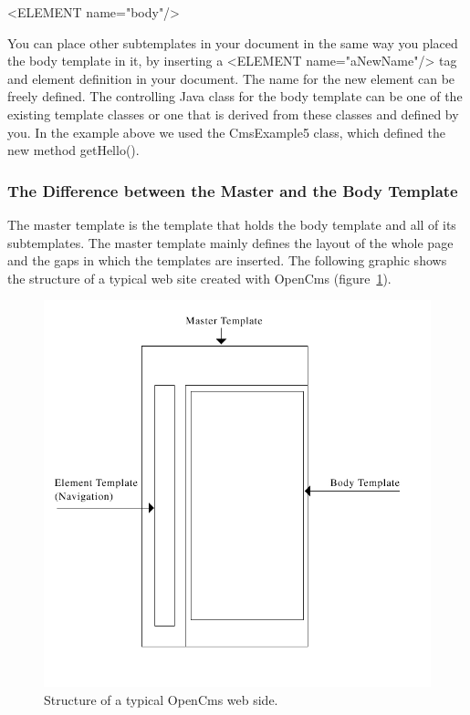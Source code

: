 {\tag <ELEMENT name="body"/>}

You can place other subtemplates in your document in the same way you
placed the body template in it, by inserting a
{\tag <ELEMENT name="aNewName"/>} tag and element definition in your document.
The name for the new element can be freely defined.
The controlling Java class for the body template can be one of the
existing template classes or one that is derived from these classes and
defined by you. In the example above we used the {\class CmsExample5} class,
which defined the new method {\meth getHello()}.


\subsubsection{The Difference between the Master and the Body Template}
The master template is the template that holds the body template and
all of its subtemplates. The master template mainly defines the layout
of the whole page and the gaps in which the templates are inserted.
The following graphic shows the structure of a typical web site created
with OpenCms (figure~\ref{DiffMasterBodyTemp}).

\begin{figure}
\begin{center}
\includegraphics[clip,width=\sgw]{pics/modules/31}
\end{center}
\caption[Structure of a typical OpenCms web side]{Structure of a typical OpenCms web side.}
\label{DiffMasterBodyTemp}
\end{figure}

